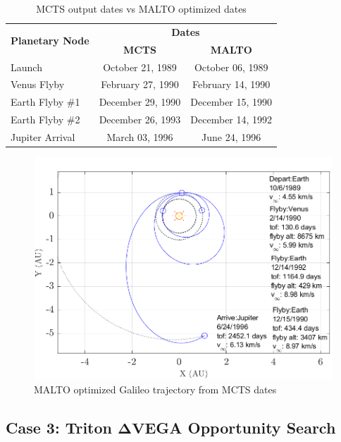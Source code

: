 \documentclass[letterpaper, preprint, paper,11pt]{AAS}	%
\begin{document}
\begin{table}[h!]
    \begin{center}
        \caption{MCTS output dates vs MALTO optimized dates}
        \label{table:galiMInputs}
        \begin{tabular}{lcc}
            \toprule
            \multirow{2}{*}{\textbf{Planetary Node}} & \multicolumn{2}{c}{\textbf{Dates}}\\
            \cmidrule{2-3}
            {} & \textbf{MCTS} & \textbf{MALTO}\\
            \midrule
            Launch          & October 21, 1989  & October 06, 1989\\
            Venus Flyby     & February 27, 1990 & February 14, 1990 \\ 
            Earth Flyby \#1 & December 29, 1990 & December 15, 1990 \\
            Earth Flyby \#2 & December 26, 1993 & December 14, 1992 \\
            Jupiter Arrival & March 03, 1996    & June 24, 1996 \\
            \bottomrule
        \end{tabular}
    \end{center}
\end{table}

\begin{figure}[h!]
    \centering
    \includegraphics[width = 5in]{./fig/galileoMalto.png}
    \caption{MALTO optimized Galileo trajectory from MCTS dates}
    \label{fig:galiMalto}
\end{figure}

\subsection{Case 3: Triton $\boldsymbol{\Delta V}$EGA Opportunity Search}
\end{document}
